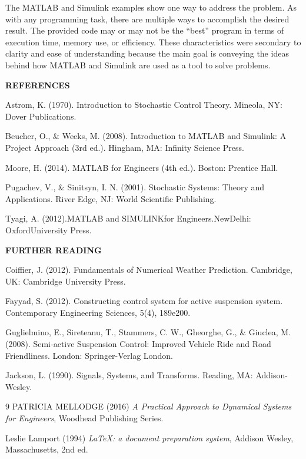 \documentclass[12pt]{article}
\begin{document}
The MATLAB and Simulink examples show one way to address the
problem. As with any programming task, there are multiple ways to
accomplish the desired result. The provided code may or may not be the
“best” program in terms of execution time, memory use, or efficiency.
These characteristics were secondary to clarity and ease of understanding
because the main goal is conveying the ideas behind how MATLAB and
Simulink are used as a tool to solve problems.

\hfill

\textbf{REFERENCES}

\hfill

Astrom, K. (1970). Introduction to Stochastic Control Theory. Mineola, NY: Dover Publications.

Beucher, O., \& Weeks, M. (2008). Introduction to MATLAB and Simulink: A Project Approach
(3rd ed.). Hingham, MA: Infinity Science Press.

Moore, H. (2014). MATLAB for Engineers (4th ed.). Boston: Prentice Hall.

Pugachev, V., \& Sinitsyn, I. N. (2001). Stochastic Systems: Theory and Applications. River
Edge, NJ: World Scientific Publishing.

Tyagi, A. (2012).MATLAB and SIMULINKfor Engineers.NewDelhi: OxfordUniversity Press.

\hfill

\textbf{FURTHER READING}

\hfill

Coiffier, J. (2012). Fundamentals of Numerical Weather Prediction. Cambridge, UK: Cambridge
University Press.

Fayyad, S. (2012). Constructing control system for active suspension system. Contemporary
Engineering Sciences, 5(4), 189e200.

Guglielmino, E., Sireteanu, T., Stammers, C. W., Gheorghe, G., \& Giuclea, M. (2008).
Semi-active Suspension Control: Improved Vehicle Ride and Road Friendliness. London:
Springer-Verlag London.

Jackson, L. (1990). Signals, Systems, and Transforms. Reading, MA: Addison-Wesley.




\begin{thebibliography}{9}
PATRICIA MELLODGE (2016) \emph{A Practical
Approach to
Dynamical Systems
for Engineers}, Woodhead Publishing Series.

Leslie Lamport (1994) \emph{\LaTeX: a document preparation system}, Addison
Wesley, Massachusetts, 2nd ed.
\end{thebibliography}
\end{document}
